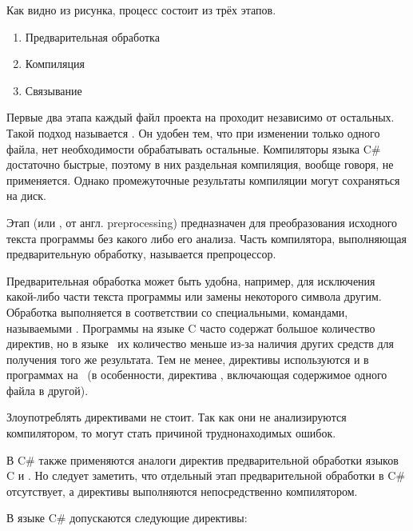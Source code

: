Как видно из рисунка, процесс состоит из трёх этапов.

\begin{enumerate}
\item Предварительная обработка
\item Компиляция
\item Связывание
\end{enumerate}

Первые два этапа каждый файл проекта на \CPP проходит независимо от
остальных.  Такой подход называется
. Он удобен тем,
что при изменении только одного файла, нет необходимости обрабатывать
остальные.  Компиляторы языка C\# достаточно быстрые, поэтому в них
раздельная компиляция, вообще говоря, не применяется. Однако
промежуточные результаты компиляции могут сохраняться на диск.

Этап  (или
, от англ. preprocessing)
предназначен для преобразования исходного текста программы без какого
либо его анализа. Часть компилятора, выполняющая предварительную
обработку, называется препроцессор.

Предварительная обработка может быть удобна, например, для исключения
какой-либо части текста программы или замены некоторого символа
другим.  Обработка выполняется в соответствии со специальными,
командами, называемыми . Программы на языке C часто содержат большое
количество директив, но в языке \CPP\ их количество меньше из-за наличия
других средств для получения того же результата. Тем не менее,
директивы используются и в программах на \CPP\ (в особенности, директива
, включающая содержимое одного файла в другой).

Злоупотреблять директивами не стоит. Так как они не анализируются
компилятором, то могут стать причиной труднонаходимых ошибок.

В C\# также применяются аналоги директив предварительной обработки
языков C и \CPP. Но следует заметить, что отдельный этап
предварительной обработки в C\# отсутствует, а директивы выполняются
непосредственно компилятором.

В языке C\# допускаются следующие директивы:

